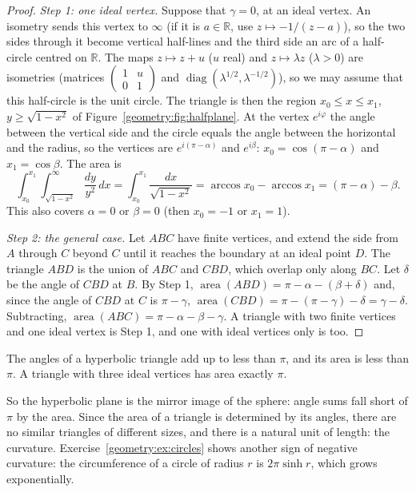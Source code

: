 \begin{proof}
\emph{Step 1: one ideal vertex.} Suppose that $\gamma=0$, at an ideal vertex. An isometry sends this vertex to $\infty$ (if it is $a\in\mathbb R$, use
$z\mapsto-1/(z-a)$), so the two sides through it become vertical half-lines and the third side an arc of a half-circle centred on $\mathbb R$. The maps
$z\mapsto z+u$ ($u$ real) and $z\mapsto\lambda z$ ($\lambda>0$) are isometries (matrices $\begin{pmatrix}1&u\\0&1\end{pmatrix}$ and
$\operatorname{diag}(\lambda^{1/2},\lambda^{-1/2})$), so we may assume that this half-circle is the unit circle. The triangle is then the region
$x_0\le x\le x_1$, $y\ge\sqrt{1-x^2}$ of Figure~\ref{geometry:fig:halfplane}. At the vertex $e^{i\varphi}$ the angle between the vertical side and the circle equals the
angle between the horizontal and the radius, so the vertices are $e^{i(\pi-\alpha)}$ and $e^{i\beta}$: $x_0=\cos(\pi-\alpha)$ and $x_1=\cos\beta$. The area is
\[
\int_{x_0}^{x_1}\int_{\sqrt{1-x^2}}^{\infty}\frac{dy}{y^2}\,dx=\int_{x_0}^{x_1}\frac{dx}{\sqrt{1-x^2}}=\arccos x_0-\arccos x_1=(\pi-\alpha)-\beta.
\]
This also covers $\alpha=0$ or $\beta=0$ (then $x_0=-1$ or $x_1=1$).

\emph{Step 2: the general case.} Let $ABC$ have finite vertices, and extend the side from $A$ through $C$ beyond $C$ until it reaches the boundary at an ideal
point $D$. The triangle $ABD$ is the union of $ABC$ and $CBD$, which overlap only along $BC$. Let $\delta$ be the angle of $CBD$ at $B$. By Step 1,
$\operatorname{area}(ABD)=\pi-\alpha-(\beta+\delta)$ and, since the angle of $CBD$ at $C$ is $\pi-\gamma$, $\operatorname{area}(CBD)=\pi-(\pi-\gamma)-\delta=
\gamma-\delta$. Subtracting, $\operatorname{area}(ABC)=\pi-\alpha-\beta-\gamma$. A triangle with two finite vertices and one ideal vertex is Step 1, and one
with ideal vertices only is too.
\end{proof}

\begin{corollary}\label{geometry:cor:anglesum}
The angles of a hyperbolic triangle add up to less than $\pi$, and its area is less than $\pi$. A triangle with three ideal vertices has area exactly $\pi$.
\end{corollary}

So the hyperbolic plane is the mirror image of the sphere: angle sums fall short of $\pi$ by the area. Since the area of a triangle is determined by its
angles, there are no similar triangles of different sizes, and there is a natural unit of length: the curvature. Exercise~\ref{geometry:ex:circles} shows another
sign of negative curvature: the circumference of a circle of radius $r$ is $2\pi\sinh r$, which grows exponentially.

